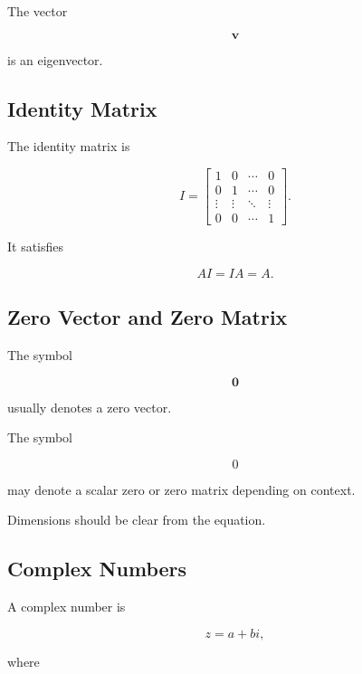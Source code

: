 The vector

\[
\mathbf{v}
\]

is an eigenvector.

\subsection{Identity Matrix}
\label{subsec:identity-matrix-reference}

The identity matrix is

\[
\boxed{
I
=
\begin{bmatrix}
1 & 0 & \cdots & 0\\
0 & 1 & \cdots & 0\\
\vdots & \vdots & \ddots & \vdots\\
0 & 0 & \cdots & 1
\end{bmatrix}.
}
\]

It satisfies

\[
\boxed{
AI=IA=A.
}
\]

\subsection{Zero Vector and Zero Matrix}
\label{subsec:zero-vector-matrix-reference}

The symbol

\[
\boxed{
\mathbf{0}
}
\]

usually denotes a zero vector.

The symbol

\[
\boxed{
0
}
\]

may denote a scalar zero or zero matrix depending on context.

Dimensions should be clear from the equation.

\subsection{Complex Numbers}
\label{subsec:complex-symbols-reference}

A complex number is

\[
\boxed{
z
=
a+bi,
}
\]

where

